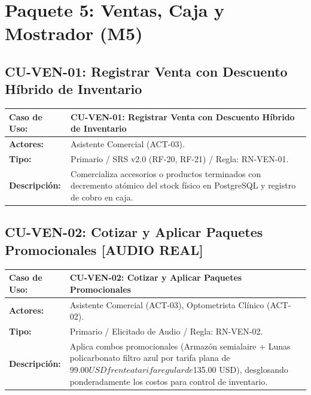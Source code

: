 \documentclass[12pt,a4paper]{report}
\begin{document}
\section{Paquete 5: Ventas, Caja y Mostrador (M5)}

\subsection{CU-VEN-01: Registrar Venta con Descuento Híbrido de Inventario}
\begin{table}[H]
\centering
\small
\begin{tabularx}{\textwidth}{|L{3.5cm}|X|}
\hline
{}\color{white}\textbf{Caso de Uso:} & \textbf{CU-VEN-01: Registrar Venta con Descuento Híbrido de Inventario} \\
\hline
\textbf{Actores:} & Asistente Comercial (ACT-03). \\
\hline
\textbf{Tipo:} & Primario / SRS v2.0 (RF-20, RF-21) / Regla: RN-VEN-01. \\
\hline
\textbf{Descripción:} & Comercializa accesorios o productos terminados con decremento atómico del stock físico en PostgreSQL y registro de cobro en caja. \\
\hline
\end{tabularx}
\end{table}

\subsection{CU-VEN-02: Cotizar y Aplicar Paquetes Promocionales [AUDIO REAL]}
\begin{table}[H]
\centering
\small
\begin{tabularx}{\textwidth}{|L{3.5cm}|X|}
\hline
{}\color{white}\textbf{Caso de Uso:} & \textbf{CU-VEN-02: Cotizar y Aplicar Paquetes Promocionales} \\
\hline
\textbf{Actores:} & Asistente Comercial (ACT-03), Optometrista Clínico (ACT-02). \\
\hline
\textbf{Tipo:} & Primario / Elicitado de Audio / Regla: RN-VEN-02. \\
\hline
\textbf{Descripción:} & Aplica combos promocionales (Armazón semialaire + Lunas policarbonato filtro azul por tarifa plana de $99.00 USD frente a tarifa regular de $135.00 USD), desglosando ponderadamente los costos para control de inventario. \\
\hline
\end{tabularx}
\end{table}
\end{document}
